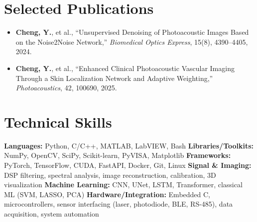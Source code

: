 \vspace*{-10pt}
\vspace*{-3pt}





\vspace*{-10pt}
\vspace*{-3pt}
\section{Selected Publications}
\begin{itemize}[leftmargin=0.2in]
 \small  \item \textbf{Cheng, Y.}, et al., ``Unsupervised Denoising of Photoacoustic Images Based on the Noise2Noise Network,'' \textit{Biomedical Optics Express}, 15(8), 4390–4405, 2024.
 \small  \item \textbf{Cheng, Y.}, et al., ``Enhanced Clinical Photoacoustic Vascular Imaging Through a Skin Localization Network and Adaptive Weighting,'' \textit{Photoacoustics}, 42, 100690, 2025.
\end{itemize}


\vspace*{-10pt}
\vspace*{-3pt}
\section{Technical Skills}
\noindent
\textbf{Languages:} Python, C/C++, MATLAB, LabVIEW, Bash  
\textbf{Libraries/Toolkits:} NumPy, OpenCV, SciPy, Scikit-learn, PyVISA, Matplotlib  
\textbf{Frameworks:} PyTorch, TensorFlow, CUDA, FastAPI, Docker, Git, Linux  
\textbf{Signal \& Imaging:} DSP filtering, spectral analysis, image reconstruction, calibration, 3D visualization  
\textbf{Machine Learning:} CNN, UNet, LSTM, Transformer, classical ML (SVM, LASSO, PCA)  
\textbf{Hardware/Integration:} Embedded C, microcontrollers, sensor interfacing (laser, photodiode, BLE, RS-485), data acquisition, system automation  



